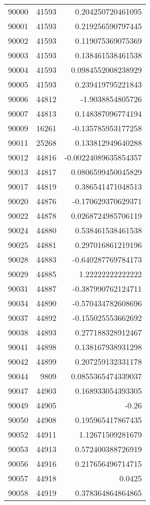 \begin{tabular}{r | r | r}
90000 & 41593 & 0.204250720461095 \\
90001 & 41593 & 0.219256590797445 \\
90002 & 41593 & 0.119075369075369 \\
90003 & 41593 & 0.138461538461538 \\
90004 & 41593 & 0.0984552008238929 \\
90005 & 41593 & 0.239419795221843 \\
90006 & 44812 & -1.9038854805726 \\
90007 & 44813 & 0.148387096774194 \\
90009 & 16261 & -0.135785953177258 \\
90011 & 25268 & 0.133812949640288 \\
90012 & 44816 & -0.00224089635854357 \\
90013 & 44817 & 0.0806599450045829 \\
90017 & 44819 & 0.386541471048513 \\
90020 & 44876 & -0.170629370629371 \\
90022 & 44878 & 0.0268724985706119 \\
90024 & 44880 & 0.538461538461538 \\
90025 & 44881 & 0.297016861219196 \\
90028 & 44883 & -0.640287769784173 \\
90029 & 44885 & 1.22222222222222 \\
90031 & 44887 & -0.387990762124711 \\
90034 & 44890 & -0.570434782608696 \\
90037 & 44892 & -0.155025553662692 \\
90038 & 44893 & 0.277188328912467 \\
90041 & 44898 & 0.138167938931298 \\
90042 & 44899 & 0.207259132331178 \\
90044 & 9809 & 0.0855365474339037 \\
90047 & 44903 & 0.168933054393305 \\
90049 & 44905 & -0.26 \\
90050 & 44908 & 0.195965417867435 \\
90052 & 44911 & 1.12671509281679 \\
90053 & 44913 & 0.572400388726919 \\
90056 & 44916 & 0.217656496714715 \\
90057 & 44918 & 0.0425 \\
90058 & 44919 & 0.378364864864865 \\

\end{tabular}
